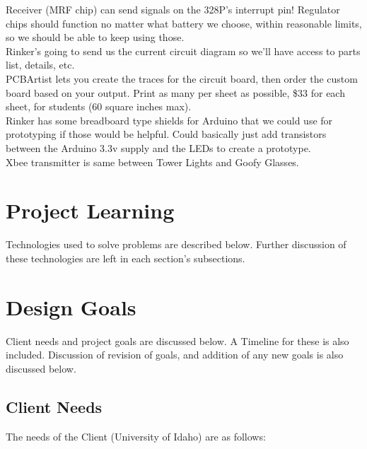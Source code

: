 \documentclass[12pt]{article}
\begin{document}
	\noindent
	Receiver (MRF chip) can send signals on the 328P’s interrupt pin! Regulator chips should function no 		matter what battery we choose, within reasonable limits, so we should be able to keep using those.\\ 
	
	\noindent	
	Rinker’s going to send us the current circuit diagram so we’ll have access to parts list, details, etc.\\ 
	
	\noindent
	PCBArtist lets you create the traces for the circuit board, then order the custom board based on your 		output. Print as many per sheet as possible, \$33 for each sheet, for students (60 square inches max).\\
	
	\noindent
	Rinker has some breadboard type shields for Arduino that we could use for prototyping if those would be 	helpful. Could basically just add transistors between the Arduino 3.3v supply and the LEDs to create a 		prototype.\\
	 
	\noindent	
	Xbee transmitter is same between Tower Lights and Goofy Glasses.\\ 	

	\clearpage

\section{Project Learning}
	Technologies used to solve problems are described below. Further discussion of these technologies are left in each section's subsections.

	\newpage
  
\section{Design Goals}
	Client needs and project goals are discussed below. A Timeline for these is also included. Discussion of revision of goals, and addition of any new goals is also discussed below.
	
	\subsection{Client Needs}
	The needs of the Client (University of Idaho) are as follows:
		
\end{document}
